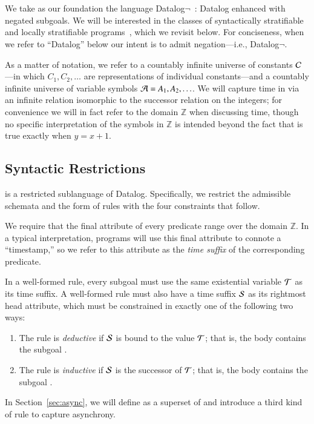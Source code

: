 \section{\large \bf \slang}
\label{sec:slang}

We take as our foundation the language Datalog$\lnot$~\cite{ullmanbook}: Datalog enhanced with negated subgoals.  We will be interested in the
classes of syntactically stratifiable 
and locally stratifiable programs~\cite{local-strat}, which we revisit below.  For conciseness, when we refer to ``Datalog'' below our intent is to admit negation---i.e., Datalog$\lnot$.  


As a matter of notation, we refer to a countably infinite universe of constants
$\Consts$---in which $C_{1}, C_{2}, \ldots$ are representations of individual
constants---and a countably infinite universe of variable symbols $\Vars = A_1,
A_2, \ldots$.
We will capture time in \slang via an infinite relation  isomorphic to the successor relation on the integers; for convenience we will in fact refer to the domain $\mathbb{Z}$ when discussing time, though no specific interpretation of the symbols in $\mathbb{Z}$ is intended beyond the fact that  is true exactly when $y = x + 1$.


\subsection{Syntactic Restrictions}
\label{sec:syntaxrestrictions}

\slang is a restricted sublanguage of Datalog.  Specifically, we restrict the
admissible schemata and the form of rules with the four constraints that follow.

We require that the final attribute of every \slang
predicate range over the domain $\mathbb{Z}$.  In a typical
interpretation, \slang programs will use this final attribute to connote a
``timestamp,'' so we refer to this attribute as the \emph{time suffix} of the
corresponding predicate.

In a well-formed \slang rule, every subgoal must use the same existential variable 
$\Tau$
as its time suffix.  A well-formed
\slang rule must also have a time suffix 
$\SDedalus$ 
as its rightmost head attribute, which must be
constrained in exactly one of the following two ways:
\begin{enumerate}
\item The rule is \emph{deductive} if $\SDedalus$ is bound to the
value $\Tau$; that is, the body contains the subgoal \dedalus{$\SDedalus$ = $\Tau$}.
\item The rule is {\em inductive} if $\SDedalus$ is the successor of
$\Tau$; that is, the body contains the subgoal .
\end{enumerate}
\noindent{}In Section~\ref{sec:async}, we will define \lang as a superset of \slang and
introduce a third kind of rule to capture asynchrony.

